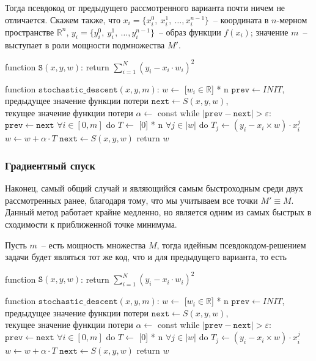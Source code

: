 \documentclass[12pt, a4paper, oneside, final]{article}
\begin{document}
	Тогда псевдокод от предыдущего рассмотренного варианта почти ничем не отличается. Скажем также, что $x_{i} = \{x^{0}_{i}, ~ x^{1}_{i}, ~ \ldots, x^{n - 1}_{i}\}$~-- координата в $n$-мерном пространстве $\mathbb{R}^{n}$, $y_{i} = \{y^{0}_{i}, ~ y^{1}_{i}, ~ \ldots, y^{n - 1}_{i}\}$~-- образ функции $f(x_{i})$; значение $m$~-- выступает в роли мощности подмножества $M'$.
	\begin{mylisting}
function $\mathtt{S}(x, y, w)$:
	return $\sum\limits_{i = 1}^{N}{(y_{i} - x_{i} \cdot w_{i})^{2}}$
	
function $\mathtt{stochastic\_descent}(x, y, m)$:
	$w \gets$ [$w_{i} \in \mathbb{R}$] * n
	$\mathtt{prev} \gets INIT$, $\text{предыдущее значение функции потери}$
	$\mathtt{next} \gets S(x, y, w)$, $\text{текущее значение функции потери}$
	$\alpha \gets$ const
	while $|\mathtt{prev} - \mathtt{next}| > \varepsilon$:
		$\mathtt{prev} \gets \mathtt{next}$
		$\forall i \in [0, m]$ do
			$T \gets$ [0] * n
			$\forall j \in |w|$ do
				$T_{j} \gets (y_{i} - x_{i} \times w) \cdot x_{i}^{j}$
			$w \gets w + \alpha \cdot T$
		$\mathtt{next} \gets S(x, y, w)$
	return $w$
	\end{mylisting}
	\subsubsection*{Градиентный спуск}
	Наконец, самый общий случай и являющийся самым быстроходным среди двух рассмотренных ранее, благодаря тому, что мы учитываем все точки $M' \equiv M$. Данный метод работает крайне медленно, но является одним из самых быстрых в сходимости к приближенной точке минимума.

	Пусть $m$~-- есть мощность множества $M$, тогда идейным псевдокодом-решением задачи будет являться тот же код, что и для предыдущего варианта, то есть
	\begin{mylisting}
function $\mathtt{S}(x, y, w)$:
	return $\sum\limits_{i = 1}^{N}{(y_{i} - x_{i} \cdot w_{i})^{2}}$
	
function $\mathtt{stochastic\_descent}(x, y, m)$:
	$w \gets$ [$w_{i} \in \mathbb{R}$] * n
	$\mathtt{prev} \gets INIT$, $\text{предыдущее значение функции потери}$
	$\mathtt{next} \gets S(x, y, w)$, $\text{текущее значение функции потери}$
	$\alpha \gets$ const
	while $|\mathtt{prev} - \mathtt{next}| > \varepsilon$:
		$\mathtt{prev} \gets \mathtt{next}$
		$\forall i \in [0, m]$ do
			$T \gets$ [0] * n
			$\forall j \in |w|$ do
				$T_{j} \gets (y_{i} - x_{i} \times w) \cdot x_{i}^{j}$
		$w \gets w + \alpha \cdot T$
	$\mathtt{next} \gets S(x, y, w)$
	return $w$
	\end{mylisting}
\end{document}

